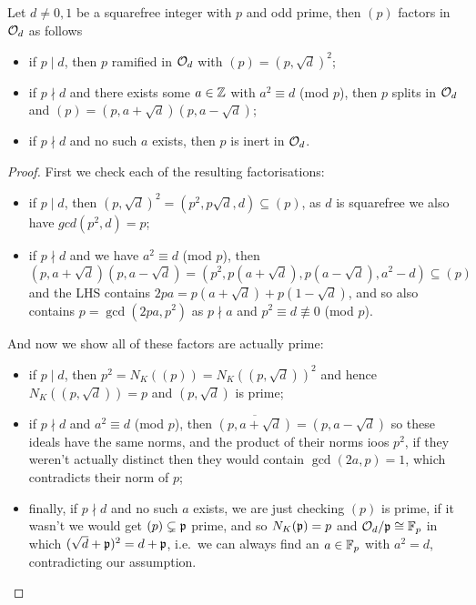 \documentclass{article}
\begin{document}
\begin{theorem}
    Let $d\neq0,1$ be a squarefree integer with $p$ and odd prime, then $(p)$ factors in $\mathcal{O}_d$ as follows \begin{itemize}
        \item if $p\mid d$, then $p$ ramified in $\mathcal{O}_d$ with $(p)=(p,\sqrt{d})^2$;
        \item if $p\nmid d$ and there exists some $a\in \mathbb{Z}$ with $a^2\equiv d$ (mod $p$), then $p$ splits in $\mathcal{O}_d$ and $(p)=(p,a+\sqrt{d})(p,a-\sqrt{d})$;
        \item if $p\nmid d$ and no such $a$ exists, then $p$ is inert in $\mathcal{O}_d$.
    \end{itemize}
    \begin{proof}
        First we check each of the resulting factorisations: \begin{itemize}
            \item if $p\mid d$, then $(p,\sqrt{d})^2=(p^2,p\sqrt{d},d)\subseteq (p)$, as $d$ is squarefree we  also have $gcd(p^2,d)=p$;
            \item if $p\nmid d$ and we have $a^2\equiv d$ (mod $p$), then \[
            (p,a+\sqrt{d})(p,a-\sqrt{d}) = (p^2,p(a+\sqrt{d}),p(a-\sqrt{d}),a^2-d)\subseteq (p)
            \] and the LHS contains $2pa = p(a+\sqrt{d}) + p(1-\sqrt{d})$, and so also contains $p=\gcd(2pa,p^2)$ as $p\nmid a$ and $p^2\equiv d \not\equiv 0$ (mod $p$).
        \end{itemize}
        And now we show all of these factors are actually prime: \begin{itemize}
            \item if $p\mid d$, then $p^2=N_K((p))=N_K((p,\sqrt{d}))^2$ and hence $N_K((p,\sqrt{d}))=p$ and $(p,\sqrt{d})$ is prime;
            \item if $p\nmid d$ and $a^2\equiv d$ (mod $p$), then $\overline{(p,a+\sqrt{d})}=(p,a-\sqrt{d})$ so these ideals have the same norms, and the product of their norms ioos $p^2$, if they weren't actually distinct then they would contain $\gcd(2a,p)=1$, which contradicts their norm of $p$;
            \item finally, if $p\nmid d$ and no such $a$ exists, we are just checking $(p)$ is prime, if it wasn't we would get $(p)\subsetneq \mathfrak{p}$ prime, and so $N_K(\mathfrak{p})=p$ and $\mathcal{O}_d/\mathfrak{p}\cong\mathbb{F}_p$ in which $(\sqrt{d}+\mathfrak{p})^2=d+\mathfrak{p}$, i.e.~we can always find an $a\in\mathbb{F}_p$ with $a^2=d$, contradicting our assumption.\qedhere
        \end{itemize}
    \end{proof}
\end{theorem}
\end{document}
